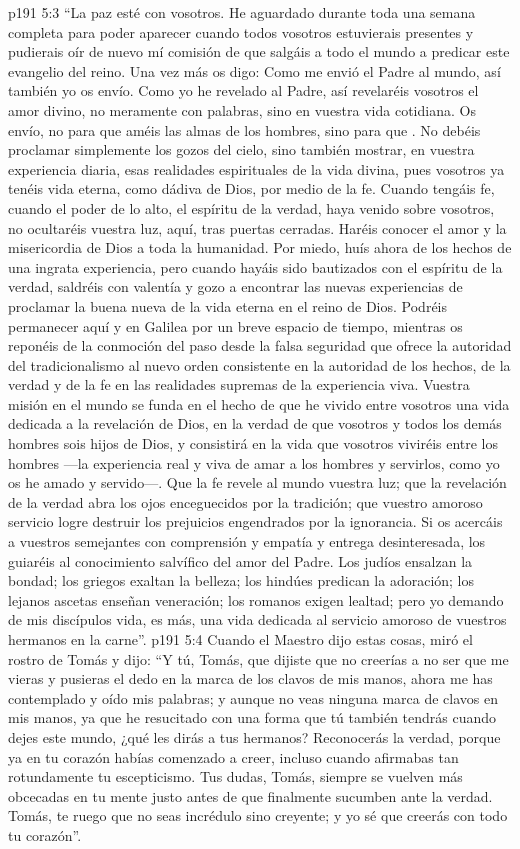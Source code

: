 \vs p191 5:3 “La paz esté con vosotros. He aguardado durante toda una semana completa para poder aparecer cuando todos vosotros estuvierais presentes y pudierais oír de nuevo mí comisión de que salgáis a todo el mundo a predicar este evangelio del reino. Una vez más os digo: Como me envió el Padre al mundo, así también yo os envío. Como yo he revelado al Padre, así revelaréis vosotros el amor divino, no meramente con palabras, sino en vuestra vida cotidiana. Os envío, no para que améis las almas de los hombres, sino para que . No debéis proclamar simplemente los gozos del cielo, sino también mostrar, en vuestra experiencia diaria, esas realidades espirituales de la vida divina, pues vosotros ya tenéis vida eterna, como dádiva de Dios, por medio de la fe. Cuando tengáis fe, cuando el poder de lo alto, el espíritu de la verdad, haya venido sobre vosotros, no ocultaréis vuestra luz, aquí, tras puertas cerradas. Haréis conocer el amor y la misericordia de Dios a toda la humanidad. Por miedo, huís ahora de los hechos de una ingrata experiencia, pero cuando hayáis sido bautizados con el espíritu de la verdad, saldréis con valentía y gozo a encontrar las nuevas experiencias de proclamar la buena nueva de la vida eterna en el reino de Dios. Podréis permanecer aquí y en Galilea por un breve espacio de tiempo, mientras os reponéis de la conmoción del paso desde la falsa seguridad que ofrece la autoridad del tradicionalismo al nuevo orden consistente en la autoridad de los hechos, de la verdad y de la fe en las realidades supremas de la experiencia viva. Vuestra misión en el mundo se funda en el hecho de que he vivido entre vosotros una vida dedicada a la revelación de Dios, en la verdad de que vosotros y todos los demás hombres sois hijos de Dios, y consistirá en la vida que vosotros viviréis entre los hombres ---la experiencia real y viva de amar a los hombres y servirlos, como yo os he amado y servido---. Que la fe revele al mundo vuestra luz; que la revelación de la verdad abra los ojos enceguecidos por la tradición; que vuestro amoroso servicio logre destruir los prejuicios engendrados por la ignorancia. Si os acercáis a vuestros semejantes con comprensión y empatía y entrega desinteresada, los guiaréis al conocimiento salvífico del amor del Padre. Los judíos ensalzan la bondad; los griegos exaltan la belleza; los hindúes predican la adoración; los lejanos ascetas enseñan veneración; los romanos exigen lealtad; pero yo demando de mis discípulos vida, es más, una vida dedicada al servicio amoroso de vuestros hermanos en la carne”.
\vs p191 5:4 Cuando el Maestro dijo estas cosas, miró el rostro de Tomás y dijo: “Y tú, Tomás, que dijiste que no creerías a no ser que me vieras y pusieras el dedo en la marca de los clavos de mis manos, ahora me has contemplado y oído mis palabras; y aunque no veas ninguna marca de clavos en mis manos, ya que he resucitado con una forma que tú también tendrás cuando dejes este mundo, ¿qué les dirás a tus hermanos? Reconocerás la verdad, porque ya en tu corazón habías comenzado a creer, incluso cuando afirmabas tan rotundamente tu escepticismo. Tus dudas, Tomás, siempre se vuelven más obcecadas en tu mente justo antes de que finalmente sucumben ante la verdad. Tomás, te ruego que no seas incrédulo sino creyente; y yo sé que creerás con todo tu corazón”.
